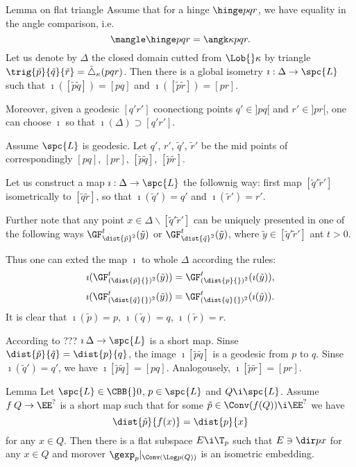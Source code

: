 {\begin{thm}{Lemma on flat triangle}
Assume that for a hinge $\hinge p q r$, we have equality in the angle comparison, i.e. 
$$\mangle\hinge p q r=\angk\kappa p q r.$$
Let us denote by $\Delta$ the closed domain cutted from $\Lob{}\kappa$ by triangle $\trig{\tilde p}{\tilde q}{\tilde r}=\tilde \triangle_\kappa(pqr)$.
Then there is a global isometry $\imath:\Delta\to \spc{L}$ such that $\imath([\tilde p\tilde q])=[pq]$ and $\imath([\tilde p\tilde r])=[pr]$.

Moreover, given a geodesic $[q'r']$ coonectiong points $q'\in]pq[$ and $r'\in]pr[$,
one can choose $\imath$ so that $\imath(\Delta)\supset[q'r']$.
\end{thm}

 Assume $\spc{L}$ is geodesic.
Let $q'$, $r'$, $\tilde q'$, $\tilde r'$ be the mid points of  correspondingly $[pq]$, $[pr]$, $[\tilde p\tilde q]$, $[\tilde p\tilde r]$.

Let us construct a map $\imath:\Delta\to \spc{L}$ the follownig way: first map $[\tilde q'\tilde r']$ isometrically to $[\tilde q\tilde r]$, so that $\imath(\tilde q')=q'$ and $\imath(\tilde r')=r'$.

Further note that any point $x\in\Delta\backslash [\tilde q'\tilde r']$ can be uniquely presented in one of the following ways $\GF_{\dist{\tilde p}^2}^t(\tilde y)$ or $\GF_{\dist{\tilde q}^2}^t(\tilde y)$, where $\tilde y\in[\tilde q'\tilde r']$ ant $t> 0$.

Thus one can exted the map $\imath$ to whole $\Delta$ according the rules:
$$\imath(\GF_{(\dist{\tilde p}{})^2}^t(\tilde y))=\GF_{(\dist{p}{})^2}^t(\imath(\tilde y)),$$
$$\imath(\GF_{(\dist{\tilde q}{})^2}^t(\tilde y))=\GF_{(\dist{q}{})^2}^t(\imath(\tilde y)).$$
It is clear that $\imath(\tilde p)=p$, $\imath(\tilde q)=q$, $\imath(\tilde r)=r$.

According to ??? $\imath\:\Delta\to\spc{L}$ is a short map.
Sinse 
$\dist{\tilde p}{\tilde q}=\dist{p}{q}$, the image
$\imath[\tilde p\tilde q]$ is a geodesic from $p$ to $q$.
Sinse $\imath(\tilde q')=q'$, we have $\imath[\tilde p\tilde q]=[pq]$.
Analogousely, $\imath[\tilde p\tilde r]=[pr]$.
\qeds






\begin{thm}{Lemma}
Let $\spc{L}\in\CBB{}0$, 
$p\in \spc{L}$ 
and $Q\i \spc{L}$.
Assume $f\:Q\to \EE^?$ is a short map such that for some $\tilde p\in\Conv(f(Q))\i \EE^?$ we have 
$$\dist{\tilde p}{f(x)}=\dist{p}{x}$$
for any $x\in Q$.
Then there is a flat subspace $E\i \T_p$ such that $E\ni\dir px$ for any $x\in Q$ and morover
$\gexp_p|_{\Conv(\Log p(Q))}$ is an isometric embedding. 
\end{thm}


}
